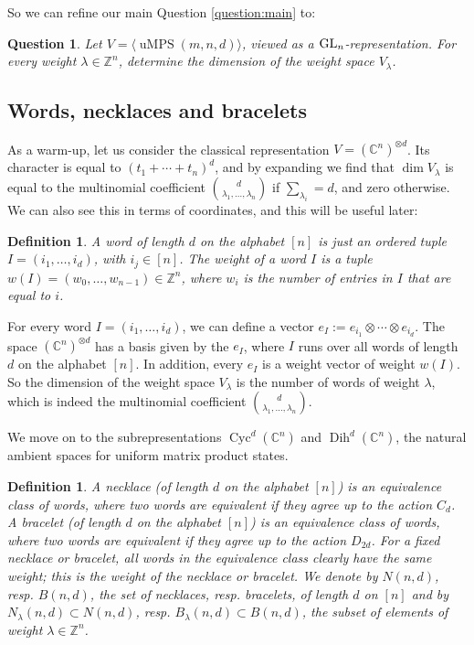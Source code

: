 \documentclass[pdftex]{sigma}
\numberwithin{equation}{section}
\newtheorem{Question}[Theorem]{Question}
\newtheorem{Definition}[Theorem]{Definition}
\newcommand{\ZZ}{\mathbb{Z}}
\newcommand{\CC}{\mathbb{C}}
\newcommand{\ot}{\otimes}
\DeclareMathOperator{\uMPS}{uMPS}
\DeclareMathOperator{\Cyc}{Cyc}
\DeclareMathOperator{\Dih}{Dih}
\begin{document}
So we can refine our main Question \ref{question:main} to:
 \begin{Question} \label{question:repPrecise}
 Let $V=\langle \uMPS(m,n,d) \rangle$, viewed as a ${\rm GL}_n$-representation.
 For every weight $\lambda \in \ZZ^n$, determine the dimension of the weight space $V_{\lambda}$.
 \end{Question}

\subsection{Words, necklaces and bracelets}
  As a warm-up, let us consider the classical representation $V=(\CC^n)^{\ot d}$. Its character is equal to $(t_1+\cdots+t_n)^d$, and by expanding we find that $\dim{V_\lambda}$ is equal to the multinomial coefficient $\binom{d}{\lambda_1, \dots,  \lambda_n}$ if $\sum_{\lambda_i} = d$, and zero otherwise.
We can also see this in terms of coordinates, and this will be useful later:
\begin{Definition}
    A \emph{word} of length $d$ on the alphabet $[n]$ is just an ordered tuple $I=(i_1,\dots,i_d)$, with $i_j \in [n]$. The \emph{weight} of a word $I$ is a tuple $w(I) = (w_0,\dots,w_{n-1}) \in \ZZ^n$, where $w_i$ is the number of entries in $I$ that are equal to $i$.
\end{Definition}
For every word $I=(i_1,\dots, i_d)$, we can define a vector $e_I := e_{i_1} \otimes \cdots \otimes e_{i_d}$. The space $(\CC^n)^{\ot d}$ has a basis given by the $e_I$, where $I$ runs over all words of length $d$ on the alphabet $[n]$. In addition, every $e_I$ is a weight vector of weight $w(I)$. So the dimension of the weight space $V_\lambda$ is the number of words of weight $\lambda$, which is indeed the multinomial coefficient $\binom{d}{\lambda_1, \dots,  \lambda_n}$.

 We move on to the subrepresentations $\Cyc^d(\CC^n)$ and $\Dih^d(\CC^n)$, the natural ambient spaces for uniform matrix product states.

 \begin{Definition}
     A \emph{necklace} (of length $d$ on the alphabet $[n]$) is an equivalence class of words, where two words are equivalent if they agree up to the action $C_d$. A \emph{bracelet} (of length $d$ on the alphabet $[n]$) is an equivalence class of words, where two words are equivalent if they agree up to the action $D_{2d}$. For a fixed necklace or bracelet, all words in the equivalence class clearly have the same weight; this is the \emph{weight} of the necklace or bracelet. We denote by $N(n,d)$, resp. $B(n,d)$, the set of necklaces, resp. bracelets, of length $d$ on $[n]$ and by $N_{\lambda}(n,d)\subset N(n,d)$, resp. $B_{\lambda}(n,d)\subset B(n,d)$, the subset of elements of weight $\lambda\in \ZZ^n$.
 \end{Definition}
\end{document}
